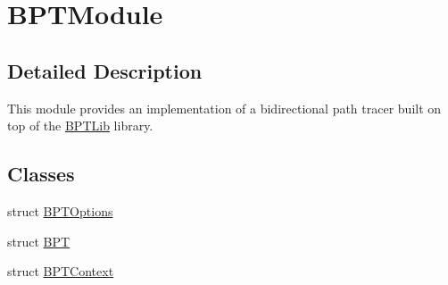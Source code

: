\hypertarget{group___b_p_t_module}{}\section{B\+P\+T\+Module}
\label{group___b_p_t_module}


\subsection{Detailed Description}
This module provides an implementation of a bidirectional path tracer built on top of the \hyperlink{_b_p_t_lib_page}{B\+P\+T\+Lib} library. \subsection*{Classes}
\begin{DoxyCompactItemize}
\item 
struct \hyperlink{struct_b_p_t_options}{B\+P\+T\+Options}
\item 
struct \hyperlink{struct_b_p_t}{B\+PT}
\item 
struct \hyperlink{struct_b_p_t_context}{B\+P\+T\+Context}
\end{DoxyCompactItemize}
